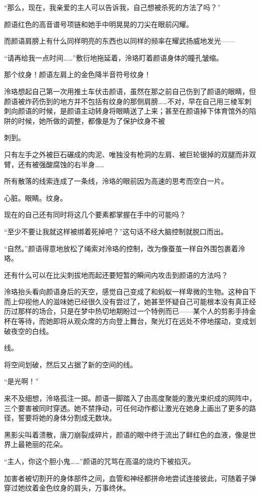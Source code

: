 \documentclass[UTF8, scheme = chinese, openany]{ctexbook}
\begin{document}
“那么，现在，我亲爱的主人可以告诉我，自己想被杀死的方法了吗？”

颜语红色的高音谱号项链和她手中明晃晃的刀尖在眼前闪耀。

而颜语肩膀上有什么同样明亮的东西也以同样的频率在耀武扬威地发光——

“请再给我一点时间……”敷衍地拖延着，泠珞盯着颜语身体的瞳孔皱缩。

那个纹身！颜语左肩上的金色降半音符号纹身！

泠珞想起自己第一次用推土车伏击颜语，虽然在那之前自己伤到了颜语的眼睛，但颜语被炸药伤到的地方并不包括有纹身的那侧肩膀……不对，早在自己用三棱军刺刺向颜语的时候，是颜语主动转身将眼睛送了上来；甚至在颜语掉下体育馆外的陷阱的时候，她所做的调整，都像是为了保护纹身不被

刺到。

只有左手之外被巨石碾成的肉泥、唯独没有枪洞的左肩、被巨轮锯掉的双腿而非双臂，还有被强酸腐蚀的右半身……

所有散落的线索连成了一条线，泠珞的眼前因为高速的思考而空白一片。

心脏。眼睛。纹身。

现在的自己还有同时将这几个要素都掌握在手中的可能吗？

“至少不要让我就这样被绑着死掉吧？”这句话不经大脑控制就脱口而出。

“自然。”颜语得意地放松了绳索对泠珞的控制，改为像蚕茧一样自外围包裹着泠珞。

还有什么可以在比尖刺拔地而起还要短暂的瞬间内攻击到颜语的方法吗？

泠珞抬头看向颜语身后的天空，感觉自己变成了和蚂蚁一样卑微的生物。这种自下而上仰视他人的滋味她已经很久没有尝过了，她甚至怀疑自己可能根本没有真正经历过那样的场合，只是在梦中热切地期盼过一个特例而已——某个人的剪影手持金杯在等待，而她即将从观众席的方向登上舞台，聚光灯在远处不停地摆动，变成划破夜空的白线。

线。

将空间划破，然后又占据了新的空间的线。

“是光啊！”

来不及细想，泠珞孤注一掷。颜语一脚踏入了由高度聚能的激光束织成的网阵中，三个要害被同时穿透。她不禁挣动，可任何动作都让激光在她身上画出了更多的路径，誓要将她的身体分割成无数块。

黑影尖叫着溃散，唐刀崩裂成碎片，颜语的眼中终于流出了鲜红色的血液，像是世界上最艳丽的花朵。

“主人，你这个胆小鬼……”颜语的咒骂在高温的烧灼下被掐灭。

加害者被切割开的身体部件之间，血管和神经都拼命地尝试连接彼此，可随着子弹穿过她纹着金色纹身的肩头，万事终休。
\end{document}
